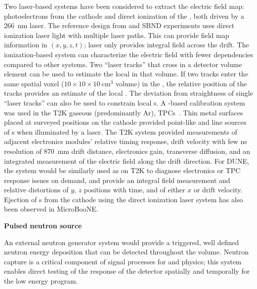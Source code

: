 Two laser-based systems have been considered to extract the electric field map: photoelectrons from the \lartpc cathode and direct ionization of the , both driven by a \SI{266}{\nano\m} laser.  The reference design from  and SBND experiments uses direct ionization laser light with multiple laser paths. This can provide field map information in $(x, y, z, t)$; \phel laser only provides integral field across the drift. The ionization-based system can characterize the electric field with fewer dependencies compared to other systems.  Two ``laser tracks'' that cross in a detector volume element can be used to estimate the local \efield in that volume. If two tracks enter the same spatial voxel  ($10 \times 10 \times 10~\textrm{cm}^3$ volume) in the , the relative position of the tracks provides an estimate of the local \threed \efield. The deviation from straightness of single ``laser tracks'' can also be used to constrain local \efield{}s. 
A \phel{}-based calibration system was used in the T2K gaseous (predominantly Ar), TPCs~\cite{Abgrall:2010hi}. 
Thin metal surfaces placed at surveyed positions on the cathode provided point-like and line sources of \phel{}s when illuminated by a laser. The T2K \phel system provided measurements of adjacent electronics modules' relative timing response, drift velocity with few \si{\nano\s} resolution of \SI{870}{\milli\m} drift distance, electronics gain, transverse diffusion, and an integrated measurement of the electric field along the drift direction. For DUNE, the system would be similarly used as on T2K to diagnose electronics or TPC response issues on demand, and provide an integral field measurement and relative distortions of $y$, $z$ positions with time, and of either $x$ or drift velocity. Ejection of \phel{}s from the cathode using the direct ionization laser system has also been observed in MicroBooNE. 

\textbf{Pulsed neutron source} 

An external neutron generator system would provide a triggered, well defined neutron energy deposition that can be detected throughout the volume. Neutron capture is a critical component of signal processes for  and  physics; this system enables direct testing of the response of the detector spatially and temporally for the low energy program.

